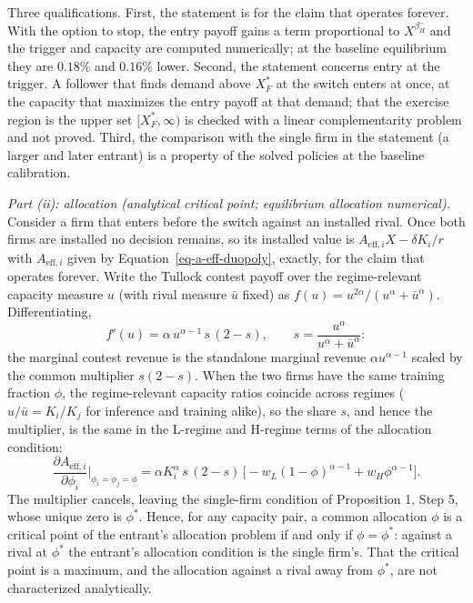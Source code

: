\documentclass[
  11pt,
  letterpaper,
]{scrartcl}
\begin{document}
Three qualifications. First, the statement is for the claim that
operates forever. With the option to stop, the entry payoff gains a term
proportional to \(X^{\beta_H^-}\) and the trigger and capacity are
computed numerically; at the baseline equilibrium they are \(0.18\%\)
and \(0.16\%\) lower. Second, the statement concerns entry at the
trigger. A follower that finds demand above \(X_F^*\) at the switch
enters at once, at the capacity that maximizes the entry payoff at that
demand; that the exercise region is the upper set \([X_F^*, \infty)\) is
checked with a linear complementarity problem and not proved. Third, the
comparison with the single firm in the statement (a larger and later
entrant) is a property of the solved policies at the baseline
calibration.

\emph{Part (ii): allocation (analytical critical point; equilibrium
allocation numerical).} Consider a firm that enters before the switch
against an installed rival. Once both firms are installed no decision
remains, so its installed value is \(A_{\text{eff},i}X - \delta K_i/r\)
with \(A_{\text{eff},i}\) given by Equation~\ref{eq-a-eff-duopoly},
exactly, for the claim that operates forever. Write the Tullock contest
payoff over the regime-relevant capacity measure \(u\) (with rival
measure \(\bar{u}\) fixed) as
\(f(u) = u^{2\alpha} / (u^\alpha + \bar{u}^\alpha)\). Differentiating,
\[
f'(u) = \alpha\, u^{\alpha - 1}\, s\,(2 - s), \qquad s = \frac{u^\alpha}{u^\alpha + \bar{u}^\alpha}:
\] the marginal contest revenue is the standalone marginal revenue
\(\alpha u^{\alpha-1}\) scaled by the common multiplier \(s(2-s)\). When
the two firms have the same training fraction \(\phi\), the
regime-relevant capacity ratios coincide across regimes
(\(u/\bar{u} = K_i/K_j\) for inference and training alike), so the share
\(s\), and hence the multiplier, is the same in the L-regime and
H-regime terms of the allocation condition: \[
\frac{\partial A_{\text{eff},i}}{\partial \phi_i}\bigg|_{\phi_i = \phi_j = \phi} = \alpha K_i^\alpha\, s\,(2 - s)\,\bigl[-w_L (1-\phi)^{\alpha-1} + w_H \phi^{\alpha-1}\bigr].
\] The multiplier cancels, leaving the single-firm condition of
Proposition 1, Step 5, whose unique zero is \(\phi^*\). Hence, for any
capacity pair, a common allocation \(\phi\) is a critical point of the
entrant's allocation problem if and only if \(\phi = \phi^*\): against a
rival at \(\phi^*\) the entrant's allocation condition is the single
firm's. That the critical point is a maximum, and the allocation against
a rival away from \(\phi^*\), are not characterized analytically.
\end{document}
